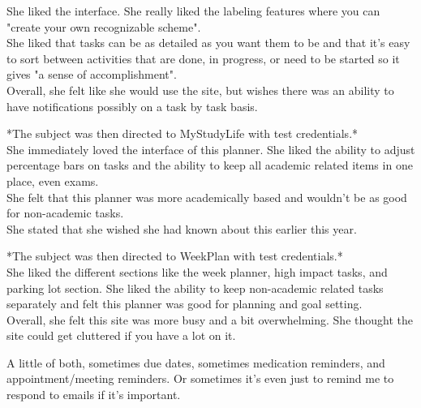 She liked the interface. She really liked the labeling features where you can "create your own recognizable scheme".\\
She liked that tasks can be as detailed as you want them to be and that it's easy to sort between activities that are done, in progress, or need to be started so it gives "a sense of accomplishment".\\
Overall, she felt like she would use the site, but wishes there was an ability to have notifications possibly on a task by task basis.

*The subject was then directed to MyStudyLife with test credentials.*\\
She immediately loved the interface of this planner. She liked the ability to adjust percentage bars on tasks and the ability to keep all academic related items in one place, even exams.\\
She felt that this planner was more academically based and wouldn't be as good for non-academic tasks.\\
She stated that she wished she had known about this earlier this year.

*The subject was then directed to WeekPlan with test credentials.*\\
She liked the different sections like the week planner, high impact tasks, and parking lot section. She liked the ability to keep non-academic related tasks separately and felt this planner was good for planning and goal setting.\\
Overall, she felt this site was more busy and a bit overwhelming. She thought the site could get cluttered if you have a lot on it.

A little of both, sometimes due dates, sometimes medication reminders, and appointment/meeting reminders. Or sometimes it’s even just to remind me to respond to emails if it’s important.

